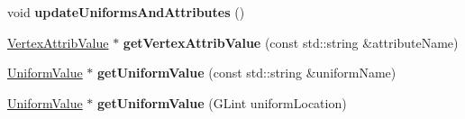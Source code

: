 \begin{DoxyCompactItemize}
\mbox{\label{classGLProgramState_a6d4e3be7de31d92ba62e282d14b3fd61}} 
void {\bfseries update\+Uniforms\+And\+Attributes} ()
\item 
\mbox{\label{classGLProgramState_a5b63773065e9e65b1094ad87524da71f}} 
\hyperlink{classVertexAttribValue}{Vertex\+Attrib\+Value} $\ast$ {\bfseries get\+Vertex\+Attrib\+Value} (const std\+::string \&attribute\+Name)
\item 
\mbox{\label{classGLProgramState_a220d5c8dd76bd893062ab899d3eb82b9}} 
\hyperlink{classUniformValue}{Uniform\+Value} $\ast$ {\bfseries get\+Uniform\+Value} (const std\+::string \&uniform\+Name)
\item 
\mbox{\label{classGLProgramState_ad3e5dc53dd40aa912919e9758e1249d3}} 
\hyperlink{classUniformValue}{Uniform\+Value} $\ast$ {\bfseries get\+Uniform\+Value} (G\+Lint uniform\+Location)
\end{DoxyCompactItemize}
